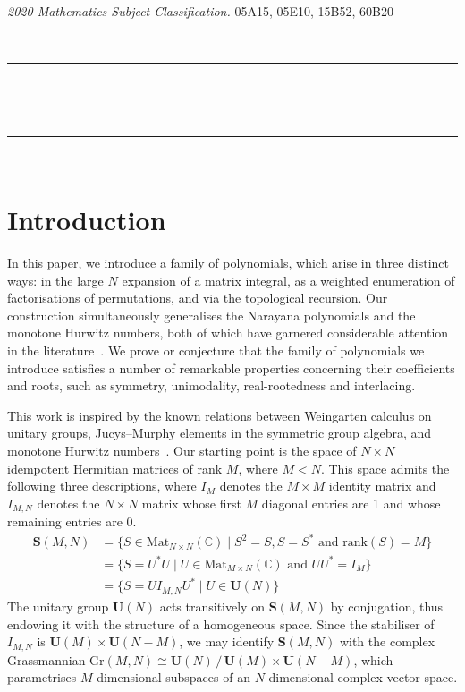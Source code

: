 \documentclass[a4paper]{article}
\theoremstyle{plain}
\numberwithin{theorem}{section}
\theoremstyle{definition}
\theoremstyle{remark}
\newcommand{\UM}{\mathbf{U}}			%
\newcommand{\SM}{\mathbf{S}}			%
\begin{document}
\emph{2020 Mathematics Subject Classification.} 05A15, 05E10, 15B52, 60B20


~

\hrule

~

\tableofcontents

~

\hrule

~



\section{Introduction} \label{sec:introduction}

In this paper, we introduce a family of polynomials, which arise in three distinct ways: in the large $N$ expansion of a matrix integral, as a weighted enumeration of factorisations of permutations, and via the topological recursion. Our construction simultaneously generalises the Narayana polynomials and the monotone Hurwitz numbers, both of which have garnered considerable attention in the literature~\cite{gou-gua-nov14,sul00}. We prove or conjecture that the family of polynomials we introduce satisfies a number of remarkable properties concerning their coefficients and roots, such as symmetry, unimodality, real-rootedness and interlacing.


This work is inspired by the known relations between Weingarten calculus on unitary groups, Jucys--Murphy elements in the symmetric group algebra, and monotone Hurwitz numbers~\cite{nov10,gou-gua-nov14}. Our starting point is the space of $N \times N$ idempotent Hermitian matrices of rank $M$, where $M < N$. This space admits the following three descriptions, where $I_M$ denotes the $M \times M$ identity matrix and $I_{M,N}$ denotes the $N \times N$ matrix whose first $M$ diagonal entries are 1 and whose remaining entries are 0.
\begin{align*}
\SM(M,N) &= \{ S \in \mathrm{Mat}_{N \times N}(\mathbb{C}) \mid S^2 = S, S = S^* \text{ and } \mathrm{rank}(S) = M \} \\
&= \{ S = U^*U \mid U \in \mathrm{Mat}_{M \times N}(\mathbb{C}) \text{ and } UU^* = I_M \} \\
&= \{ S = U I_{M,N} U^* \mid U \in \UM(N) \}
\end{align*}
The unitary group $\UM(N)$ acts transitively on $\SM(M,N)$ by conjugation, thus endowing it with the structure of a homogeneous space. Since the stabiliser of $I_{M,N}$ is $\UM(M) \times \UM(N-M)$, we may identify $\SM(M,N)$ with the complex Grassmannian $\mathrm{Gr}(M,N) \cong \UM(N) \, / \, \UM(M) \times \UM(N-M)$, which parametrises $M$-dimensional subspaces of an $N$-dimensional complex vector space.
\end{document}

